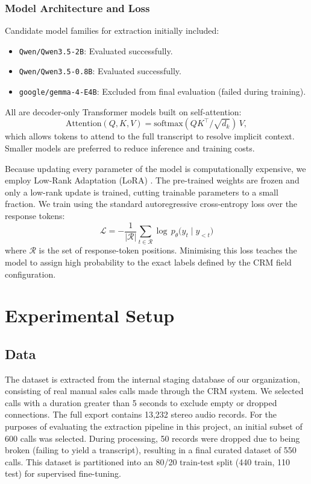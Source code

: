 \documentclass[unnumsec,webpdf,modern,large]{oup-authoring-template}%
\theoremstyle{thmstyleone}%
\theoremstyle{thmstyletwo}%
\theoremstyle{thmstylethree}%
\begin{document}
\subsubsection{Model Architecture and Loss}
Candidate model families for extraction initially included:
\begin{itemize}
    \item \texttt{Qwen/Qwen3.5-2B}: Evaluated successfully.
    \item \texttt{Qwen/Qwen3.5-0.8B}: Evaluated successfully.
    \item \texttt{google/gemma-4-E4B}: Excluded from final evaluation (failed during training). 
\end{itemize}

All are decoder-only Transformer models \cite{vaswani2017attention} built on self-attention:
\[
  \mathrm{Attention}(Q,K,V)=\mathrm{softmax}({QK^{\top}}/{\sqrt{d_k}})\,V,
\]
which allows tokens to attend to the full transcript to resolve implicit context. Smaller models are preferred to reduce inference and training costs.

Because updating every parameter of the model is computationally expensive, we employ Low-Rank Adaptation (LoRA) \cite{hu2022lora}. The pre-trained weights are frozen and only a low-rank update is trained, cutting trainable parameters to a small fraction. We train using the standard autoregressive cross-entropy loss over the response tokens:
\begin{equation}
  \mathcal{L} = -\frac{1}{|\mathcal{R}|} \sum_{t \in \mathcal{R}} \log\, p_\theta\!\bigl(y_t \mid y_{<t}\bigr)
  \label{eq:ce_loss}
\end{equation}
where $\mathcal{R}$ is the set of response-token positions. Minimising this loss teaches the model to assign high probability to the exact labels defined by the CRM field configuration.

\section{Experimental Setup}
\label{sec:experimental-setup}

\subsection{Data}
The dataset is extracted from the internal staging database of our organization, consisting of real manual sales calls made through the CRM system. We selected calls with a duration greater than 5 seconds to exclude empty or dropped connections. The full export contains 13,232 stereo audio records. For the purposes of evaluating the extraction pipeline in this project, an initial subset of 600 calls was selected. During processing, 50 records were dropped due to being broken (failing to yield a transcript), resulting in a final curated dataset of 550 calls. This dataset is partitioned into an 80/20 train-test split (440 train, 110 test) for supervised fine-tuning.
\end{document}
